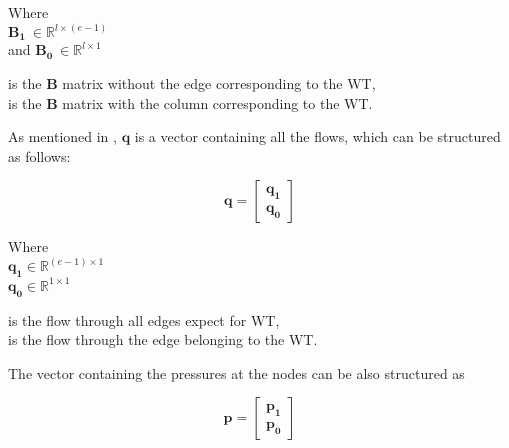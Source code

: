 \begin{minipage}[t]{0.24\textwidth}
Where\\
\hspace*{8mm} $\bm{B_1} \: \in \mathbb{R}^{l \times (e-1)}$  \\
and \hspace*{0.4mm} $\bm{B_0} \: \in \mathbb{R}^{l \times 1} $ 
\end{minipage}
\begin{minipage}[t]{0.70\textwidth}
\vspace*{2mm}
\hspace*{4mm} is the $\bm{B}$ matrix without the edge corresponding to the WT,\\
\hspace*{4mm} is the $\bm{B}$ matrix with the column corresponding to the WT.
\end{minipage}

As mentioned in , $\bm{q}$ is a vector containing all the flows, which can be structured as follows:

\begin{equation}
\bm{q} =
\begin{bmatrix}
         \bm{q_1} \\
	\bm{q_0} 
\end{bmatrix}
\label{qmatrix}
\end{equation}

\begin{minipage}[t]{0.24\textwidth}
Where\\
\hspace*{8mm} $\bm{q_1} \in \mathbb{R}^{(e-1) \times 1}$  \\
\hspace*{8mm} $\bm{q_0} \in \mathbb{R}^{1 \times 1} $ 
\end{minipage}
\begin{minipage}[t]{0.68\textwidth}
\vspace*{2mm}
\hspace*{4mm} is the flow through all edges expect for WT,\\
\hspace*{4mm} is the flow through the edge belonging to the WT. 
\end{minipage}

The vector containing the pressures at the nodes can be also structured as

\begin{equation}
\bm{p} =
\begin{bmatrix}
         \bm{p_1} \\
	\bm{p_0} 
\end{bmatrix}
\end{equation}

